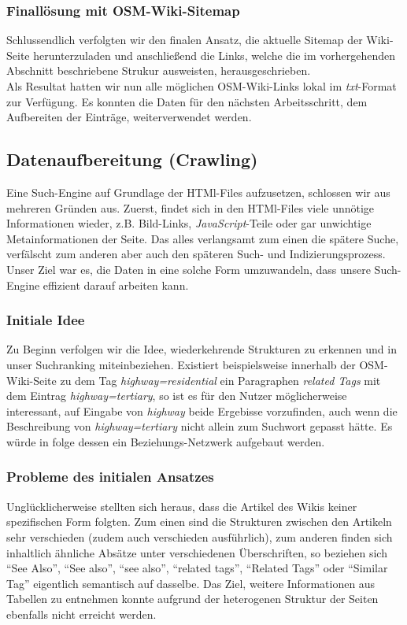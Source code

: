 \documentclass[12pt,pdftex,a4paper]{article}
\begin{document}
\subsubsection{Finallösung mit OSM-Wiki-Sitemap}
Schlussendlich verfolgten wir den finalen Ansatz, die aktuelle Sitemap der Wiki-Seite\cite{sitemap-index-wiki-link} herunterzuladen und anschließend die Links, welche die im vorhergehenden Abschnitt beschriebene Strukur ausweisten, herausgeschrieben.\\
Als Resultat hatten wir nun alle möglichen OSM-Wiki-Links lokal im \textit{txt}-Format zur Verfügung. Es konnten die Daten für den nächsten Arbeitsschritt, dem Aufbereiten der Einträge, weiterverwendet werden.

\subsection{Datenaufbereitung (Crawling)}
Eine Such-Engine auf Grundlage der HTMl-Files aufzusetzen, schlossen wir aus mehreren Gründen aus. Zuerst, findet sich in den HTMl-Files viele unnötige Informationen wieder, z.B. Bild-Links, \textit{JavaScript}-Teile oder gar unwichtige Metainformationen der Seite. Das alles verlangsamt zum einen die spätere Suche, verfälscht zum anderen aber auch den späteren Such- und Indizierungsprozess.\\
Unser Ziel war es, die Daten in eine solche Form umzuwandeln, dass unsere Such-Engine effizient darauf arbeiten kann.

\subsubsection{Initiale Idee}
Zu Beginn verfolgen wir die Idee, wiederkehrende Strukturen zu erkennen und in unser Suchranking miteinbeziehen. Existiert beispielsweise innerhalb der OSM-Wiki-Seite zu dem Tag \textit{highway=residential} ein Paragraphen \textit{related Tags} mit dem Eintrag \textit{highway=tertiary}, so ist es für den Nutzer möglicherweise interessant, auf Eingabe von \textit{highway} beide Ergebisse vorzufinden, auch wenn die Beschreibung von \textit{highway=tertiary} nicht allein zum Suchwort gepasst hätte. Es würde in folge dessen ein Beziehungs-Netzwerk aufgebaut werden.

\subsubsection{Probleme des initialen Ansatzes}
Unglücklicherweise stellten sich heraus, dass die Artikel des Wikis keiner spezifischen Form folgten. Zum einen sind die Strukturen zwischen den Artikeln sehr verschieden (zudem auch verschieden ausführlich), zum anderen finden sich inhaltlich ähnliche Absätze unter verschiedenen Überschriften, so beziehen sich ``See Also'', ``See also'', ``see also'', ``related tags'', ``Related Tags'' oder ``Similar Tag'' eigentlich semantisch auf dasselbe.
Das Ziel, weitere Informationen aus Tabellen zu entnehmen konnte aufgrund der heterogenen Struktur der Seiten ebenfalls nicht erreicht werden.
\end{document}
